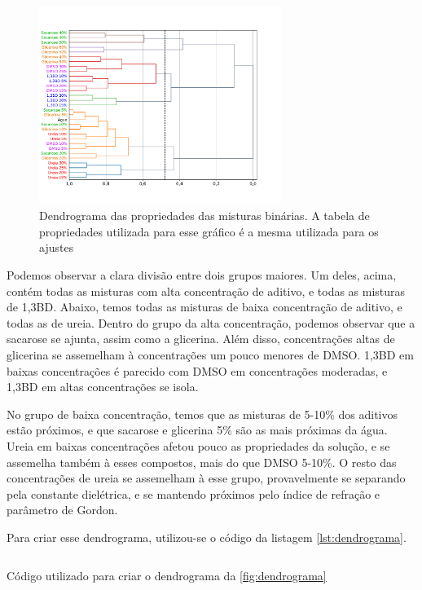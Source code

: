 		\begin{figure}[h]
			\centering
			\includegraphics[width=0.7\textwidth]{imagens/propriedades/dendrograma}
			\caption{Dendrograma das propriedades das misturas binárias. A tabela de propriedades utilizada para esse gráfico é a mesma utilizada para os ajustes}
			\label{fig:dendrograma}
		\end{figure}
		
		Podemos observar a clara divisão entre dois grupos maiores. Um deles, acima, contém todas as misturas com alta concentração de aditivo, e todas as misturas de 1,3BD. Abaixo, temos todas as misturas de baixa concentração de aditivo, e todas as de ureia. Dentro do grupo da alta concentração, podemos observar que a sacarose se ajunta, assim como a glicerina. Além disso, concentrações altas de glicerina se assemelham à concentrações um pouco menores de DMSO. 1,3BD em baixas concentrações é parecido com DMSO em concentrações moderadas, e 1,3BD em altas concentrações se isola.
		
		No grupo de baixa concentração, temos que as misturas de 5-10\% dos aditivos estão próximos, e que sacarose e glicerina 5\% são as mais próximas da água. Ureia em baixas concentrações afetou pouco as propriedades da solução, e se assemelha também à esses compostos, mais do que DMSO 5-10\%. O resto das concentrações de ureia se assemelham à esse grupo, provavelmente se separando pela constante dielétrica, e se mantendo próximos pelo índice de refração e parâmetro de Gordon.
		
		Para criar esse dendrograma, utilizou-se o código da listagem \ref{lst:dendrograma}.
		
		\begin{listing}[h]
			\inputminted{python}{./python/dendrograma.py}
			\caption{Código utilizado para criar o dendrograma da \autoref{fig:dendrograma}}
			\label{lst:dendrograma}
		\end{listing}
		\FloatBarrier

